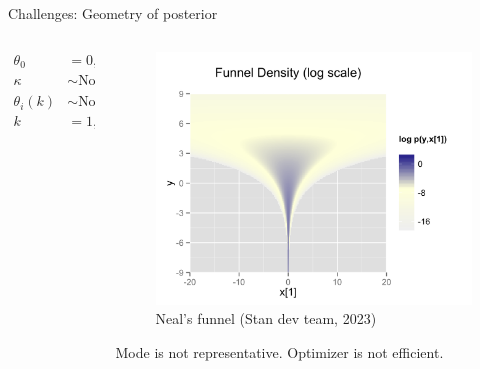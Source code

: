 \documentclass[bigger]{beamer}
\begin{document}
\begin{frame}[label={sec:org53e2056}]{Challenges: Geometry of posterior}
\begin{columns}
\begin{column}{0.4\columnwidth}
\begin{align*}
  \theta_0 &= 0,\\
  \kappa &\sim \text{Normal}(0, 3),\\
  \theta_i(k) &\sim \text{Normal}(0, \exp{(\kappa/2)}),\\
  k&=1,2,\dots
\end{align*}
\end{column}

\begin{column}{0.6\columnwidth}
\begin{figure}[htbp]
\centering
\includegraphics[width=\textwidth]{./figure/funnel.png}
\caption{Neal's funnel (Stan dev team, 2023)}
\end{figure}
\scriptsize Mode is not representative. Optimizer is not efficient.
\end{column}
\end{columns}
\end{frame}
\end{document}
